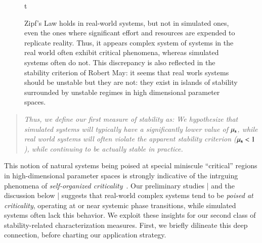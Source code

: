 \documentclass[onecolumn, compsoc,11pt]{IEEEtran}
\renewcommand{\captionN}[1]{\caption{\color{CadetBlue4!80!black} \sffamily \fontsize{10}{11}\selectfont #1  }}
\begin{document}
\begin{figure}{t}
\tikzexternalenable
\centering
 


\captionN{Zipf's Law holds in real-world systems, but not in simulated ones, even  the ones where  significant effort and resources are  expended  to  replicate reality. Thus, it appears complex system of systems in the real world often exhibit critical phenomena, whereas simulated systems often do not. This discrepancy is also reflected in the stability criterion of Robert May: it seems that real worls systems should be unstable but they are not: they exist in islands of stability surrounded by unstable regimes in high dimensional parameter spaces.}\label{figzipf}
\end{figure}
%
\begin{quote}\itshape 
Thus, we  define our first measure of stability as:
 We hypothesize that simulated systems will typically have a significantly lower value of $\mu_\S$, while real world systems will often violate the apparent stability criterion ($\mu_\S < 1$), while continuing to be actually stable in practice.
\end{quote}
This notion of natural systems being poised at special miniscule ``critical'' regions   in  high-dimensional parameter spaces  is strongly indicative of the   intrguing phenomena  of \textit{self-organized criticality}~\cite{mora2011biological}.  Our preliminary studies | and  the discussion below | suggests that real-world complex systems tend to be \textit{poised at criticality}, operating at or near systemic phase transitions, while simulated systems often lack this behavior. We exploit these insights  for our second class of  stability-related characterization measures. First, we briefly dilineate this deep  connection, before charting our  application strategy.

\end{document}
